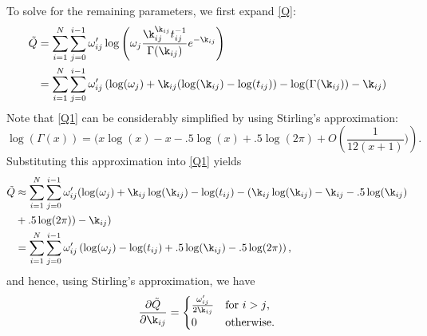 \documentclass[12pt,leqno]{article}
\begin{document}
To solve for the remaining parameters, we first expand \eqref{Q}:
\begin{equation}\label{Q1}
  \begin{split}
    \tilde{Q} &= \sum_{i=1}^N\sum_{j=0}^{i-1}\omega'_{ij}\log\left(\omega_j\frac{\k_{ij}^{\k_{ij}}t_{ij}^{-1}}
          {\Gamma(\k_{ij})}e^{-\k_{ij}} \right)\\
    &= \sum_{i=1}^N\sum_{j=0}^{i-1}\omega'_{ij}\left(\log(\omega_j)+\k_{ij}(\log(\k_{ij}) - \log(t_{ij})) 
          -\log(\Gamma(\k_{ij})) -\k_{ij}\right)\\
  \end{split}
\end{equation}
Note that \eqref{Q1} can be considerably simplified by using Stirling's approximation:
\begin{equation}\label{stirling}
  \log(\Gamma(x)) =  (x\log(x) -x - .5\log(x) + .5\log(2\pi) + O\left(\frac{1}{12(x+1)})\right).%
\end{equation}
Substituting this approximation into \eqref{Q1} yields
\begin{equation}\label{Q2}
  \begin{split}
    \tilde{Q} &\approx \sum_{i=1}^N\sum_{j=0}^{i-1}\omega'_{ij}(\log(\omega_j)+\k_{ij}\log(\k_{ij}) - \log(t_{ij})
    -(\k_{ij}\log(\k_{ij}) -\k_{ij} -.5\log(\k_{ij}) \\
    &+ .5\log(2\pi)) -\k_{ij})\\
  &= \sum_{i=1}^N\sum_{j=0}^{i-1}\omega'_{ij}\left(\log(\omega_j) - \log(t_{ij}) + .5\log(\k_{ij})
  - .5\log(2\pi) \right),
  \end{split}
\end{equation}
and hence, using Stirling's approximation, we have 
\begin{equation}\label{dQ_dk}
  \frac{\partial\tilde{Q}}{\partial\k_{ij}} = \begin{cases}
\frac{\omega'_{ij}}{2\k_{ij}}&\text{for $i > j$,}\\
0 & \text{otherwise}.
\end{cases}
\end{equation}
\end{document}

